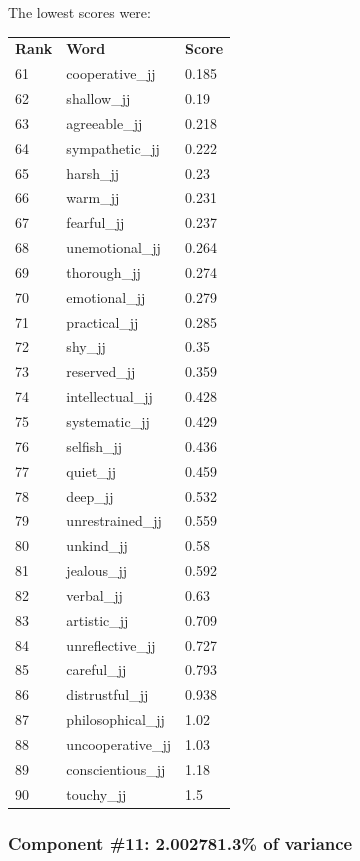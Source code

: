 \documentclass[10pt,letterpaper]{book}
\begin{document}
The lowest scores were:
\begin{tabular}{ l l l }
        \textbf{Rank} & \textbf{Word} & \textbf{Score} \\
        61 & cooperative\_jj & 0.185 \\
        62 & shallow\_jj & 0.19 \\
        63 & agreeable\_jj & 0.218 \\
        64 & sympathetic\_jj & 0.222 \\
        65 & harsh\_jj & 0.23 \\
        66 & warm\_jj & 0.231 \\
        67 & fearful\_jj & 0.237 \\
        68 & unemotional\_jj & 0.264 \\
        69 & thorough\_jj & 0.274 \\
        70 & emotional\_jj & 0.279 \\
        71 & practical\_jj & 0.285 \\
        72 & shy\_jj & 0.35 \\
        73 & reserved\_jj & 0.359 \\
        74 & intellectual\_jj & 0.428 \\
        75 & systematic\_jj & 0.429 \\
        76 & selfish\_jj & 0.436 \\
        77 & quiet\_jj & 0.459 \\
        78 & deep\_jj & 0.532 \\
        79 & unrestrained\_jj & 0.559 \\
        80 & unkind\_jj & 0.58 \\
        81 & jealous\_jj & 0.592 \\
        82 & verbal\_jj & 0.63 \\
        83 & artistic\_jj & 0.709 \\
        84 & unreflective\_jj & 0.727 \\
        85 & careful\_jj & 0.793 \\
        86 & distrustful\_jj & 0.938 \\
        87 & philosophical\_jj & 1.02 \\
        88 & uncooperative\_jj & 1.03 \\
        89 & conscientious\_jj & 1.18 \\
        90 & touchy\_jj & 1.5 \\
\end{tabular}
\subsubsection{Component \#11: 2.002781.3\% of variance}
\end{document}
